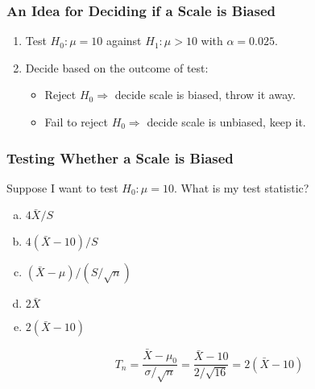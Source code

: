 \documentclass{beamer}
\begin{document}

\begin{frame}
	\frametitle{An Idea for Deciding if a Scale is Biased}

\begin{enumerate}
	\item Test $H_0 \colon \mu = 10$ against $H_1\colon \mu > 10$ with $\alpha =0.025$.
	\item Decide based on the outcome of test:
		\begin{itemize}
	\item Reject $H_0 \Rightarrow$ decide scale is biased, throw it away.
	\item Fail to reject $H_0 \Rightarrow$ decide scale is unbiased, keep it.
			\end{itemize}	
\end{enumerate}

\end{frame}
\begin{frame}[t]
	\frametitle{Testing Whether a Scale is Biased }

	\vspace{2em}

	Suppose I want to test $H_0\colon \mu = 10$. What is my test statistic? 

	\vspace{1em}

	\begin{enumerate}[(a)]
		\item $4\bar{X}/S$  
		\item $4(\bar{X} - 10)/S$
		\item $(\bar{X} - \mu)/(S/\sqrt{n})$
		\item $2 \bar{X}$
		\item $2(\bar{X} - 10)$ 
	\end{enumerate}

	\pause
	\alert{$$T_n = \frac{\bar{X} - \mu_0}{\sigma/\sqrt{n}} = \frac{\bar{X} - 10}{2/\sqrt{16}} = 2(\bar{X} - 10)$$}
\end{frame}
\end{document}

